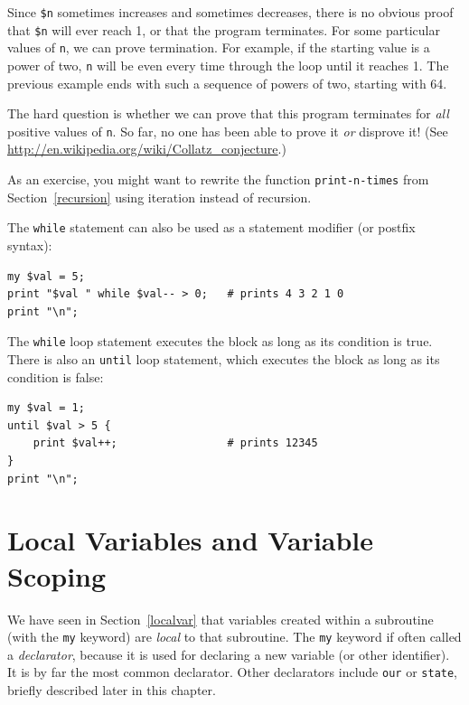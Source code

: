 Since {\tt \$n} sometimes increases and sometimes decreases, there is no
obvious proof that {\tt \$n} will ever reach 1, or that the program
terminates.  For some particular values of {\tt n}, we can prove
termination.  For example, if the starting value is a power of two,
{\tt n} will be even every time through the loop
until it reaches 1. The previous example ends with such a sequence
of powers of two, starting with 64.

The hard question is whether we can prove that this program terminates
for {\em all} positive values of {\tt n}.  So far, no one has
been able to prove it {\em or} disprove it!  (See
\url{http://en.wikipedia.org/wiki/Collatz_conjecture}.)

As an exercise, you might want to rewrite the function 
\verb"print-n-times" from Section~\ref{recursion} using 
iteration instead of recursion.

The {\tt while} statement can also be used as a statement modifier (or postfix syntax):

\begin{verbatim}
my $val = 5;
print "$val " while $val-- > 0;   # prints 4 3 2 1 0
print "\n";
\end{verbatim}

The {\tt while} loop statement executes the block as long as 
its condition is true. There is also an {\tt until} loop 
statement, which executes the block as long as its condition 
is false:

\begin{verbatim}
my $val = 1;
until $val > 5 {
    print $val++;                 # prints 12345
}
print "\n";
\end{verbatim}

\section{Local Variables and Variable Scoping}

We have seen in Section~\ref{localvar} that variables created 
within a subroutine (with the {\tt my} keyword) are \emph{local} 
to that subroutine. The {\tt my} 
keyword if often called a \emph{declarator}, because it 
is used for declaring a new variable (or other identifier). 
It is by far the most common declarator. Other declarators 
include {\tt our} or {\tt state}, briefly described later 
in this chapter. 

